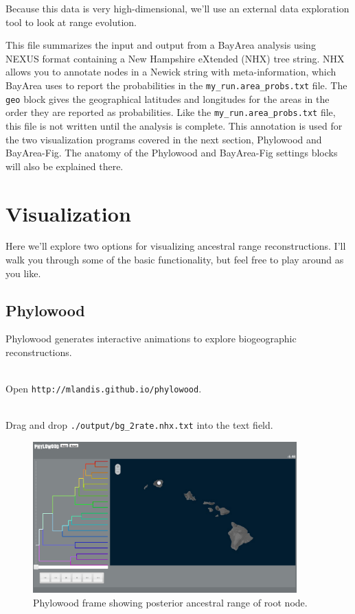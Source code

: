 Because this data is very high-dimensional, we'll use an external data exploration tool to look at range evolution.

This file summarizes the input and output from a BayArea analysis using NEXUS format containing a New Hampshire eXtended (NHX) tree string.
NHX allows you to annotate nodes in a Newick string with meta-information, which BayArea uses to report the probabilities in the \texttt{my\_run.area\_probs.txt} file.
The \texttt{geo} block gives the geographical latitudes and longitudes for the areas in the order they are reported as probabilities.
Like the \texttt{my\_run.area\_probs.txt} file, this file is not written until the analysis is complete.
This annotation is used for the two visualization programs covered in the next section, Phylowood and BayArea-Fig.
The anatomy of the Phylowood and BayArea-Fig settings blocks will also be explained there.

\section{Visualization}

Here we'll explore two options for visualizing ancestral range reconstructions.
I'll walk you through some of the basic functionality, but feel free to play around as you like.

\subsection{Phylowood}

Phylowood generates interactive animations to explore biogeographic reconstructions.

\noindent \\ \impmark Open \texttt{http://mlandis.github.io/phylowood}.

\noindent \\ \impmark Drag and drop \texttt{./output/bg\_2rate.nhx.txt} into the text field.

\begin{figure}[H]
\centering
\includegraphics[width=4in]{figures/phw_mrca}
\caption{Phylowood frame showing posterior ancestral range of root node.}
\end{figure}

